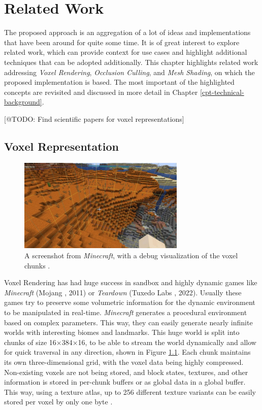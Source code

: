 \chapter{Related Work} \label{cpt-related-work}

The proposed approach is an aggregation of a lot of ideas and implementations that have been 
around for quite some time. It is of great interest to explore related work, which can provide 
context for use cases and highlight additional techniques that can be adopted additionally. 
This chapter highlights related work addressing \emph{Voxel Rendering}, \emph{Occlusion Culling}, 
and \emph{Mesh Shading}, on which the proposed implementation is based. The most important of 
the highlighted concepts are revisited and discussed in more detail in Chapter 
\ref{cpt-technical-background}. 

[@TODO: Find scientific papers for voxel representations]

\section{Voxel Representation} \label{sec-voxel-representation}

\begin{figure}[h]
    \centering
    \includegraphics[width=300px]{images/graphics/minecraft-chunks.jpg}
    \caption{A screenshot from \emph{Minecraft}, with a debug visualization of the voxel chunks \cite{Palm2022}.}
    \label{fig:minecraft-chunks}
\end{figure}

\noindent
Voxel Rendering has had huge success in sandbox and highly dynamic games like \emph{Minecraft} (Mojang 
\cite{Mojang2024}, 2011) or \emph{Teardown} (Tuxedo Labs \cite{TuxedoLabs2022}, 2022). Usually these games try 
to preserve some volumetric information for the dynamic environment to be manipulated in real-time. \emph{Minecraft} 
generates a procedural environment based on complex parameters. This way, they can easily generate nearly infinite 
worlds with interesting biomes and landmarks. This huge world is split into chunks of size 16×384×16, to be able to 
stream the world dynamically and allow for quick traversal in any direction, shown in Figure \ref{fig:minecraft-chunks}.
Each chunk maintains its own three-dimensional grid, with the voxel data being highly compressed. Non-existing voxels 
are not being stored, and block states, textures, and other information is stored in per-chunk buffers or as global 
data in a global buffer. This way, using a texture atlas, up to 256 different texture variants can be easily stored 
per voxel by only one byte \cite{Bergensten2012, MinecraftFandom2021}. \\

